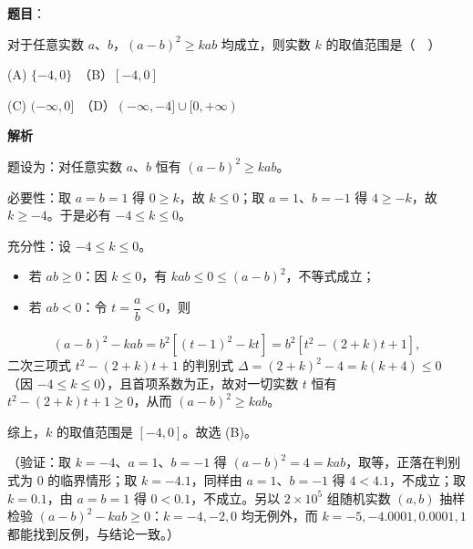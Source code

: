 \begin{answer}

\textbf{题目}：

对于任意实数 \(a\)、\(b\)，\((a-b)^{2}\geqslant kab\) 均成立，则实数 \(k\) 的取值范围是（　）

(A) \(\{-4,0\}\)　（B）\([-4,0]\)

(C) \((-\infty,0]\)　（D）\((-\infty,-4]\cup[0,+\infty)\)

\textbf{解析}

题设为：对任意实数 \(a\)、\(b\) 恒有 \((a-b)^{2}\geqslant kab\)。

必要性：取 \(a=b=1\) 得 \(0\geqslant k\)，故 \(k\leqslant0\)；取 \(a=1\)、\(b=-1\) 得 \(4\geqslant-k\)，故 \(k\geqslant-4\)。于是必有 \(-4\leqslant k\leqslant0\)。

充分性：设 \(-4\leqslant k\leqslant0\)。

\begin{itemize}
\item 若 \(ab\geqslant0\)：因 \(k\leqslant0\)，有 \(kab\leqslant0\leqslant(a-b)^{2}\)，不等式成立；
\item 若 \(ab<0\)：令 \(t=\dfrac{a}{b}<0\)，则
\end{itemize}
\nopagebreak[4]
\[
(a-b)^{2}-kab=b^{2}\left[(t-1)^{2}-kt\right]=b^{2}\left[t^{2}-(2+k)t+1\right],
\]
二次三项式 \(t^{2}-(2+k)t+1\) 的判别式 \(\Delta=(2+k)^{2}-4=k(k+4)\leqslant0\)（因 \(-4\leqslant k\leqslant0\)），且首项系数为正，故对一切实数 \(t\) 恒有 \(t^{2}-(2+k)t+1\geqslant0\)，从而 \((a-b)^{2}\geqslant kab\)。

综上，\(k\) 的取值范围是 \([-4,0]\)。故选 (B)。

（验证：取 \(k=-4\)、\(a=1\)、\(b=-1\) 得 \((a-b)^{2}=4=kab\)，取等，正落在判别式为 \(0\) 的临界情形；取 \(k=-4.1\)，同样由 \(a=1\)、\(b=-1\) 得 \(4<4.1\)，不成立；取 \(k=0.1\)，由 \(a=b=1\) 得 \(0<0.1\)，不成立。另以 \(2\times10^{5}\) 组随机实数 \((a,b)\) 抽样检验 \((a-b)^{2}-kab\geqslant0\)：\(k=-4,-2,0\) 均无例外，而 \(k=-5,-4.0001,0.0001,1\) 都能找到反例，与结论一致。）


\end{answer}
